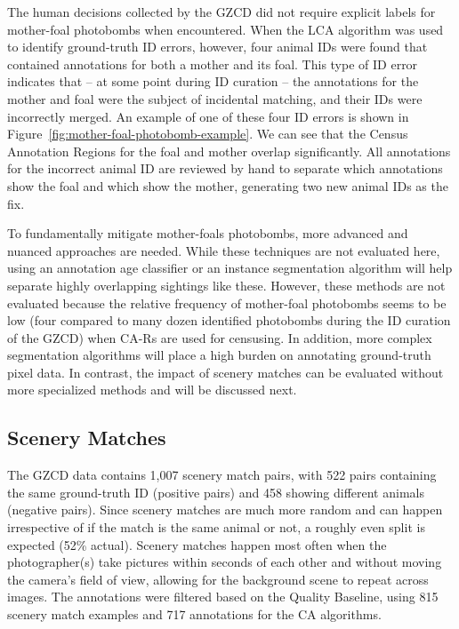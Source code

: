 The human decisions collected by the GZCD did not require explicit labels for mother-foal photobombs when encountered.  When the LCA algorithm was used to identify ground-truth ID errors, however, four animal IDs were found that contained annotations for both a mother and its foal.  This type of ID error indicates that -- at some point during ID curation -- the annotations for the mother and foal were the subject of incidental matching, and their IDs were incorrectly merged.  An example of one of these four ID errors is shown in Figure~\ref{fig:mother-foal-photobomb-example}.  We can see that the Census Annotation Regions for the foal and mother overlap significantly. All annotations for the incorrect animal ID are reviewed by hand to separate which annotations show the foal and which show the mother, generating two new animal IDs as the fix.

To fundamentally mitigate mother-foals photobombs, more advanced and nuanced approaches are needed.  While these techniques are not evaluated here, using an annotation age classifier or an instance segmentation algorithm will help separate highly overlapping sightings like these. However, these methods are not evaluated because the relative frequency of mother-foal photobombs seems to be low (four compared to many dozen identified photobombs during the ID curation of the GZCD) when CA-Rs are used for censusing. In addition, more complex segmentation algorithms will place a high burden on annotating ground-truth pixel data.  In contrast, the impact of scenery matches can be evaluated without more specialized methods and will be discussed next.

\subsection{Scenery Matches}

The GZCD data contains 1,007 scenery match pairs, with 522 pairs containing the same ground-truth ID (positive pairs) and 458 showing different animals (negative pairs).  Since scenery matches are much more random and can happen irrespective of if the match is the same animal or not, a roughly even split is expected (52\% actual).  Scenery matches happen most often when the photographer(s) take pictures within seconds of each other and without moving the camera's field of view, allowing for the background scene to repeat across images.  The annotations were filtered based on the Quality Baseline, using 815 scenery match examples and 717 annotations for the CA algorithms.

